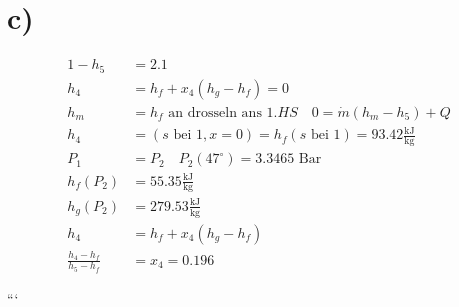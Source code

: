 

\section*{c)}

\begin{align*}
1 - h_5 &= 2.1 \\
h_4 &= h_f + x_4 (h_g - h_f) = 0 \\
h_m &= h_f \text{ an } \text{drosseln} \text{ ans } 1. HS \quad 0 = \dot{m} (h_m - h_5) + Q \\
h_4 &= (s \text{ bei } 1, x = 0) = h_f (s \text{ bei } 1) = 93.42 \frac{\text{kJ}}{\text{kg}} \\
P_1 &= P_2 \quad P_2 (47^\circ) = 3.3465 \text{ Bar} \\
h_f (P_2) &= 55.35 \frac{\text{kJ}}{\text{kg}} \\
h_g (P_2) &= 279.53 \frac{\text{kJ}}{\text{kg}} \\
h_4 &= h_f + x_4 (h_g - h_f) \\
\frac{h_4 - h_f}{h_5 - h_f} &= x_4 = 0.196
\end{align*}

```